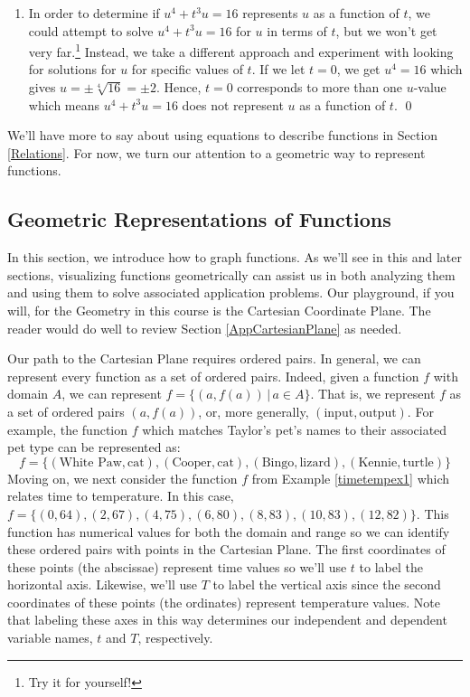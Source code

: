 \documentclass{ximera}
\begin{document}
\begin{ex}
\begin{enumerate}
\begin{enumerate}
\item  In order to determine if  $u^{4} + t^{3}u = 16$ represents $u$ as a function of $t$, we could attempt to solve $u^{4} + t^{3}u = 16$ for $u$ in terms of $t$, but we won't get very far.\footnote{Try it for yourself!}  Instead, we take a different approach and experiment with looking for solutions for $u$ for specific values of $t$.  If we let $t = 0$, we get $u^{4} = 16$ which gives $u = \pm \sqrt[4]{16} = \pm 2$.  Hence, $t = 0$ corresponds to more than one $u$-value which means  $u^{4}  +t^{3}u = 16$  does not represent $u$ as a function of $t$.  \qed

\end{enumerate}

\end{enumerate}

\end{ex}

We'll have more to say about using equations to describe functions in Section \ref{Relations}.  For now, we turn our attention to a geometric way to represent functions.

\subsection{Geometric Representations of Functions}
\label{geometricrepresentationssection}

In this section, we introduce how to graph functions.  As we'll see in this and later sections, visualizing functions geometrically can assist us in both analyzing them and using them to solve associated application problems.  Our playground, if you will, for the Geometry in this course is the Cartesian Coordinate Plane.  The reader would do well to review Section \ref{AppCartesianPlane} as needed.

\medskip

Our path to the Cartesian Plane requires ordered pairs.  In general, we can represent every function as a set of ordered pairs.  Indeed, given a function $f$ with domain $A$, we can represent $f = \{ (a, f(a)) \, | \, a \in A\}$.  That is, we represent $f$ as a set of ordered pairs $(a, f(a))$, or, more generally, $(\text{input}, \text{output})$.  For example, the function $f$ which matches Taylor's pet's names to their associated pet type can be represented as: \[ f = \{ (\text{White Paw}, \text{cat}), (\text{Cooper}, \text{cat}), (\text{Bingo}, \text{lizard}), (\text{Kennie}, \text{turtle}) \} \] Moving on, we next  consider the function $f$ from Example \ref{timetempex1} which relates time to temperature. In this case,  $f = \{ (0, 64), (2, 67), (4, 75), (6, 80), (8, 83), (10, 83), (12, 82) \}$.   This function has numerical values for both the domain and range so we can identify these ordered pairs with points in the Cartesian Plane.  The first coordinates of these points (the abscissae) represent time values so we'll use $t$ to label the horizontal axis.  Likewise, we'll use $T$ to label the vertical axis since the second coordinates of these points (the ordinates) represent temperature values.  Note that labeling these axes in this way determines our independent and dependent variable names, $t$ and $T$, respectively.
\end{document}
